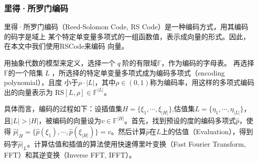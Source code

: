 \documentclass[zihao=-4]{ctexart}
\begin{document}
\begin{spacing}{1.5}
\subsubsection{里得·所罗门编码}
里得·所罗门编码\cite{Fourty-two}\cite{Eight}（Reed-Solomon Code, RS Code）是一种编码方式，用其编码的码字是域上
某个特定单变量多项式的一组函数值，表示成向量的形式。因此，在本文中我们使用RS\;Code来编码
向量。\par
用抽象代数的模型来定义，选择一个$\;q\;$阶的有限域$\mathbb{F}$，作为编码的字母表。
再选择$\mathbb{F}$的一个陪集$\;L\;$，所选择的特定单变量多项式成为编码多项式（encoding polynomial），且度
小于$\rho\cdot|L|$，其中$\rho\in(0,1)$称为编码率，用这样的多项式编码出的向量表示为
$\text{RS}[L,\rho]\in\mathbb{F}^{|L|}$。\par
具体而言，编码的过程如下：设插值集$H=\{\xi_1,\cdots,\xi_{|H|}\}$,估值集$L=\{\eta_1,\cdots,\eta_{|L|}\}$，
且$|L|>|H|$，被编码的向量设为$v\in\mathbb{F}^{|H|}$。首先，找到预设的度的编码多项式$\hat{p}$，使得
$\hat{p}|_H=\{\hat{p}(\xi_1),\cdots,\hat{p}(\xi_{|H|})\}=v$。然后计算$\hat{p}$在$L$上的估值（Evaluation），得到
码字$\hat{p}|_L$。计算估值和插值的算法使用快速傅里叶变换（Fast Fourier Transform, FFT）和其逆变换（Inverse FFT, IFFT）。


\end{spacing}
\end{document}
